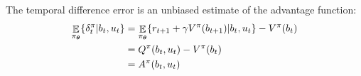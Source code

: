 The temporal difference error is an unbiased estimate of the advantage function:
\begin{align}
  \displaystyle \mathop \mathbb{E}_{\pi_{\boldsymbol{\theta}}} \{ \delta^{\pi}_t|b_t,u_t\} &=  \mathop\mathbb{E}_{\pi_{\boldsymbol{\theta}}}\{ r_{t+1} + \gamma V^{\pi}(b_{t+1})|b_t,u_t\} - V^{\pi}(b_t) \nonumber \\
									   &= Q^{\pi}(b_t,u_t) - V^{\pi}(b_t) \nonumber \\
									   &= A^{\pi}(b_t,u_t)
\end{align}
